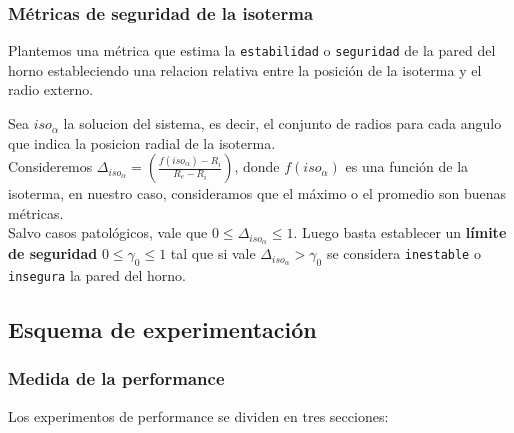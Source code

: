 \subsubsection{Métricas de seguridad de la isoterma}
Plantemos una métrica que estima la \texttt{estabilidad} o \texttt{seguridad} de la pared del horno estableciendo una relacion relativa entre la posición de la isoterma y el radio externo. 
\begin{proposition} Sea $iso_\alpha$ la solucion del sistema, es decir, el conjunto de radios para cada angulo que indica la posicion radial de la isoterma.\\
    Consideremos $\Delta_{iso_\alpha} = \left( \frac{f(iso_\alpha) - R_i}{R_e - R_i} \right)$, donde $f(iso_\alpha)$ es una función de la isoterma, en nuestro caso, consideramos que el máximo o el promedio son buenas métricas.\\
    Salvo casos patológicos, vale que $0 \leq \Delta_{iso_\alpha}\leq 1$. Luego basta establecer un \textbf{límite de seguridad} $0 \leq \gamma_0 \leq 1$ tal que si vale $\Delta_{iso_\alpha} > \gamma_0$ se considera \texttt{inestable} o \texttt{insegura} la pared del horno.
\end{proposition}

\subsection{Esquema de experimentación}
\subsubsection{Medida de la performance}

Los experimentos de performance se dividen en tres secciones:

